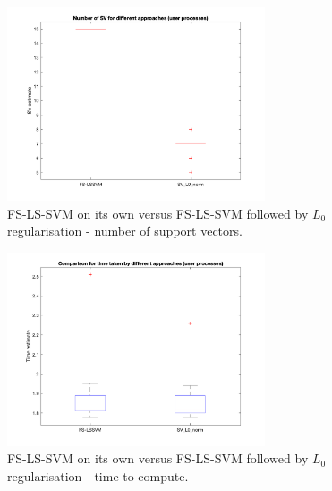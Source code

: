 \documentclass[10pt,a4paper]{article}
\begin{document}
\begin{figure}[h!]
\centering
  \includegraphics[width=3in]{SVestimComp.png}
  \caption{FS-LS-SVM on its own versus FS-LS-SVM followed by $L_0$ regularisation - number of support vectors.}
  \label{fig:SVestimComp}
\end{figure}

\begin{figure}[h!]
\centering
  \includegraphics[width=3in]{TimeEstimComp.png}
  \caption{FS-LS-SVM on its own versus FS-LS-SVM followed by $L_0$ regularisation - time to compute.}
  \label{fig:TimeEstimComp}
\end{figure}






\end{document}

